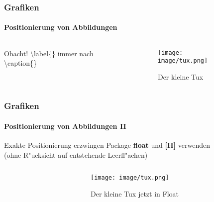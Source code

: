 
\begin{frame}
\frametitle{Grafiken}
\framesubtitle{Positionierung von Abbildungen}
\begin{columns}
\begin{column}{.5\textwidth}
{\ttfamily {\footnotesize
}}

\begin{alertblock}{Obacht!}
\color{nounibaredI}\textbackslash label\color{black}\{\} immer nach \color{nounibaredI}\textbackslash caption\color{black}\{\}
\end{alertblock}
\end{column}

\begin{column}{.5\textwidth} 
\begin{figure}
\begin{center}
    \texttt{[image: image/tux.png]}
\caption{Der kleine Tux}
\label{img:kleinertux}
\end{center}
\end{figure}
\end{column}
\end{columns}
\end{frame}


\begin{frame}[t]
\medskip
\frametitle{Grafiken}
\framesubtitle{Positionierung von Abbildungen II }
\begin{block}{Exakte Positionierung erzwingen}
Package {\ttfamily \textbf{float}} und \textbf{[H]} verwenden\\
(ohne R"ucksicht auf entstehende Leerfl"achen)
\end{block}

\begin{columns}
\begin{column}{.5\textwidth}
{\ttfamily {\footnotesize
}}
\end{column}

\begin{column}{.5\textwidth} 
\begin{figure}
\begin{center}
    \texttt{[image: image/tux.png]}
\caption{Der kleine Tux jetzt in Float}
\label{img:kleinertux_float}
\end{center}
\end{figure}
\end{column}
\end{columns}

\end{frame}
